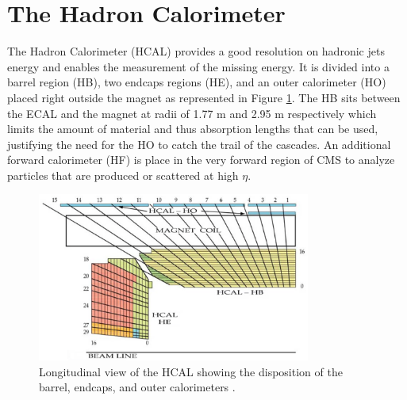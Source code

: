   \section{The Hadron Calorimeter}

    The Hadron Calorimeter (HCAL) provides a good resolution on hadronic jets energy and enables the measurement of the missing energy. It is divided into a barrel region (HB), two endcaps regions (HE), and an outer calorimeter (HO) placed right outside the magnet as represented in Figure \ref{fig:I-3-hcal}. The HB sits between the ECAL and the magnet at radii of 1.77 m and 2.95 m respectively which limits the amount of material and thus absorption lengths that can be used, justifying the need for the HO to catch the trail of the cascades. An additional forward calorimeter (HF) is place in the very forward region of CMS to analyze particles that are produced or scattered at high $ \eta $. \\

    \begin{figure}[h!]
      \centering
      \includegraphics[width=0.8\textwidth]{img/I-3-cms/hcal.png}
      \caption{Longitudinal view of the HCAL showing the disposition of the barrel, endcaps, and outer calorimeters \cite{1748-0221-3-08-S08004}.}
      \label{fig:I-3-hcal}
    \end{figure}

